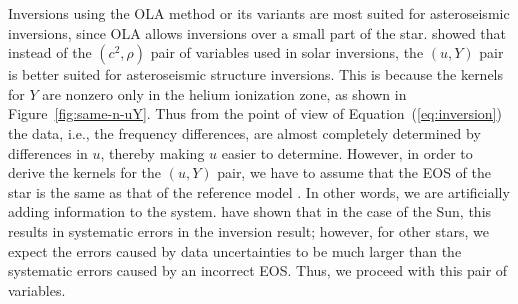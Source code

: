 Inversions using the OLA method or its variants are most suited for asteroseismic inversions, since OLA allows inversions over a small part of the star. 
\citet{2003Ap&SS.284..153B} showed that instead of the ${(c^2,\rho)}$ pair of variables used in solar inversions, the ${(u, Y)}$ pair is better suited for asteroseismic structure inversions. 
This is because the kernels for $Y$ are nonzero only in the helium ionization zone, as shown in Figure~\ref{fig:same-n-uY}. 
Thus from the point of view of Equation~(\ref{eq:inversion}) the data, i.e., the frequency differences, are almost completely determined by differences in $u$, thereby making $u$ easier to determine. 
However, in order to derive the kernels for the ${(u, Y)}$ pair, we have to assume that the EOS of the star is the same as that of the reference model \citep{1990MNRAS.244..542D, Kosovichev1999, ThompsonJCD2002}. 
In other words, we are artificially adding information to the system. 
\citet{1997A&A...322L...5B} have shown that in the case of the Sun, this results in systematic errors in the inversion result; 
however, for other stars, we expect the errors caused by data uncertainties to be much larger than the systematic errors caused by an incorrect EOS. 
Thus, we proceed with this pair of variables. 

